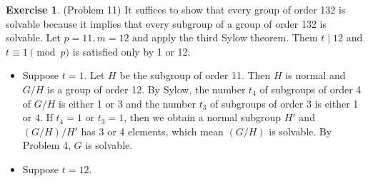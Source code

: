 \documentclass[12pt, psamsfonts]{amsart}
\theoremstyle{definition}
\newtheorem*{exer}{Exercise}
\theoremstyle{remark}
\numberwithin{equation}{section}
\begin{document}
\begin{exer}{(Problem 11)}
  It suffices to show that every group of order 132 is solvable because it implies that every subgroup of a group of order 132 is solvable.
  Let $p = 11, m = 12$ and apply the third Sylow theorem.
  Them $t \mid 12$ and $t \equiv 1 \pmod p$ is satisfied only by 1 or 12.
  \begin{itemize}
    \item
      Suppose $t = 1$.
      Let $H$ be the subgroup of order 11.
      Then $H$ is normal and $G / H$ is a group of order 12.
      By Sylow, the number $t_4$ of subgroups of order 4 of $G / H$ is either 1 or 3 and the number $t_3$ of subgroups of order 3 is either 1 or 4.
      If $t_4 = 1$ or $t_3 = 1$, then we obtain a normal subgroup $H'$ and $(G / H) / H'$ has 3 or 4 elements, which mean $(G / H)$ is solvable.
      By Problem 4, $G$ is solvable.
    \item
      Suppose $t = 12$.
  \end{itemize}
\end{exer}
\end{document}

